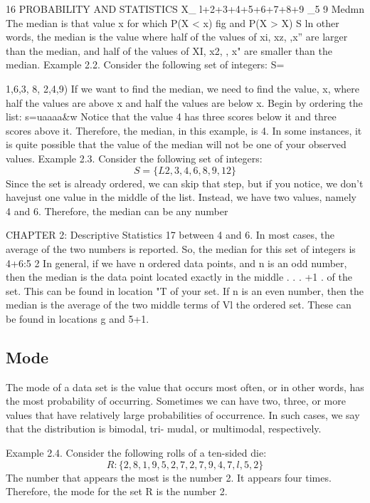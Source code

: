 16 PROBABILITY AND STATISTICS
X_ l+2+3+4+5+6+7+8+9 _5
9
Medmn
The median is that value x for which P(X < x) ﬁg and P(X > X) S %
ln other words, the median is the value where half of the values of xi,
xz,  ,x” are larger than the median, and half of the values of XI, x2,  ,
x" are smaller than the median.
Example 2.2. Consider the following set of integers:
S= {1,6,3, 8, 2,4,9)
If we want to ﬁnd the median, we need to ﬁnd the value, x, where
half the values are above x and half the values are below x. Begin by
ordering the list:
s=uaaaa&w
Notice that the value 4 has three scores below it and three
scores above it. Therefore, the median, in this example, is 4.
In some instances, it is quite possible that the value of the
median will not be one of your observed values.
Example 2.3. Consider the following set of integers:
\[ S= \{L2, 3,4, 6, 8, 9, 12\} \]
Since the set is already ordered, we can
skip that step, but if you notice, we don’t
havejust one value in the middle of the list.
Instead, we have two values, namely 4 and
6. Therefore, the median can be any number


CHAPTER 2: Descriptive Statistics 17
between 4 and 6. In most cases, the average of the two numbers is
reported. So, the median for this set of integers is
4+6:5
2
In general, if we have n ordered data points, and n is an odd
number, then the median is the data point located exactly in the middle
. . . +1 .
of the set. This can be found in location "T of your set. If n is an
even number, then the median is the average of the two middle terms of
Vl
the ordered set. These can be found in locations g and 5+1.

\subsection{Mode}
The mode of a data set is the value that occurs most often, or in other
words, has the most probability of occurring. Sometimes we can have
two, three, or more values that have relatively large probabilities of
occurrence. In such cases, we say that the distribution is bimodal, tri-
mudal, or multimodal, respectively.

Example 2.4. Consider the following rolls of a ten-sided die:
\[R: \{2, 8, 1, 9, 5, 2, 7, 2, 7, 9, 4, 7, l, 5, 2\}\]
The number that appears the most is the number 2. It appears four times. Therefore, the mode for the set R is the number 2.

}
